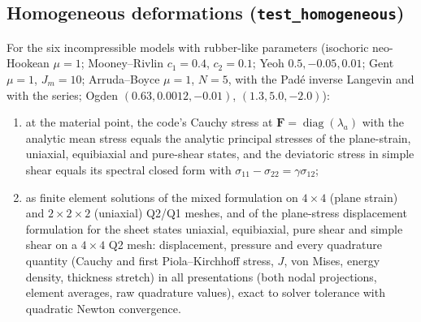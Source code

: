 \documentclass[11pt]{article}
\newcommand{\diag}{\operatorname{diag}}
\newcommand{\bF}{\bm{F}}
\begin{document}
\subsection{Homogeneous deformations (\texttt{test\_homogeneous})}
For the six incompressible models with rubber-like parameters (isochoric
neo-Hookean $\mu = 1$; Mooney--Rivlin $c_1 = 0.4$, $c_2 = 0.1$; Yeoh
$0.5, -0.05, 0.01$; Gent $\mu = 1$, $J_m = 10$; Arruda--Boyce $\mu = 1$,
$N = 5$, with the Pad\'e inverse Langevin and with the series; Ogden $(0.63, 0.0012, -0.01)$, $(1.3, 5.0, -2.0)$):
\begin{enumerate}[nosep]
  \item at the material point, the code's Cauchy stress at
    $\bF = \diag(\lambda_a)$ with the analytic mean stress equals the
    analytic principal stresses of the plane-strain, uniaxial, equibiaxial
    and pure-shear states, and the deviatoric stress in simple shear equals
    its spectral closed form with $\sigma_{11} - \sigma_{22} = \gamma\sigma_{12}$;
  \item as finite element solutions of the mixed formulation on $4\times4$
    (plane strain) and $2\times2\times2$ (uniaxial) Q2/Q1 meshes, and of the
    plane-stress displacement formulation for the sheet states uniaxial,
    equibiaxial, pure shear and simple shear on a $4\times4$ Q2 mesh:
    displacement, pressure and every quadrature quantity (Cauchy and first
    Piola--Kirchhoff stress, $J$, von Mises, energy density, thickness
    stretch) in all presentations (both nodal projections, element
    averages, raw quadrature values), exact to solver tolerance with
    quadratic Newton convergence.
\end{enumerate}
\end{document}
